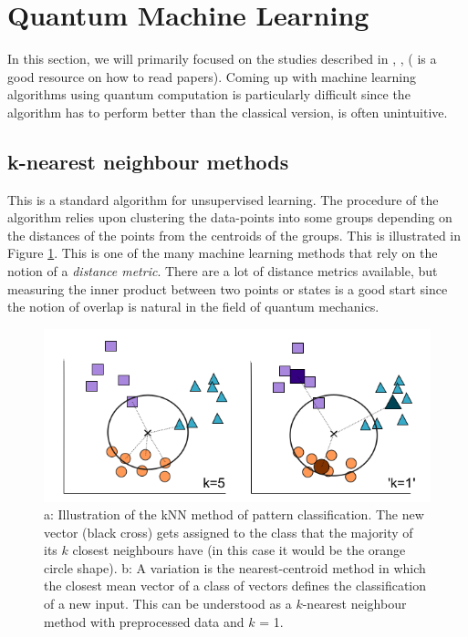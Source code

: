 \documentclass[conference]{IEEEtran}
\begin{document}
\section{Quantum Machine Learning}
In this section, we will primarily focused on the studies described in \cite{b1}, \cite{b5}, \cite{b7} (\cite{b8} is a good resource on how to read papers). 
Coming up with machine learning algorithms using quantum computation is particularly difficult since the algorithm has to perform better than the classical version, 
is often unintuitive.

\subsection{k-nearest neighbour methods}
This is a standard algorithm for unsupervised learning. The procedure of the algorithm relies upon clustering the data-points into some groups
depending on the distances of the points from the centroids of the groups. This is illustrated in Figure \ref{knn}. This is one of the many 
machine learning methods that rely on the notion of a \textit{distance metric}. There are a lot of distance metrics available, but measuring 
the inner product between two points or states is a good start since the notion of overlap is natural in the field of quantum mechanics.

\begin{figure}[htbp]
\centerline{\includegraphics[scale = 0.3]{Images/knn.png}}
\caption{a: Illustration of the
kNN method of pattern classification. The new vector (black cross) gets assigned to the class that the
majority of its $k$ closest neighbours have (in this case
it would be the orange circle shape). b: A variation
is the nearest-centroid method in which the closest
mean vector of a class of vectors defines the classification of a new input. This can be understood as a
$k$-nearest neighbour method with preprocessed data
and $k$ = 1.}
\label{knn}
\end{figure}
\end{document}
